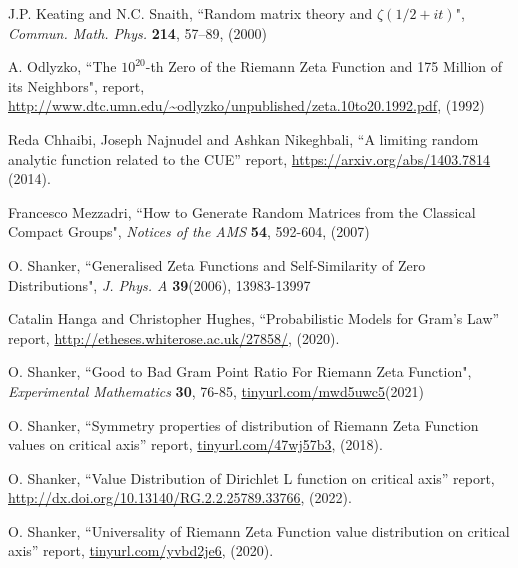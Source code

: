 \documentclass[twoside]{article}
\begin{document}

\begin{thebibliography}{10}

 J.P. Keating and N.C. Snaith, 
``Random matrix theory and $\zeta (1/2+it)$", 
{\it Commun. Math. Phys.} {\bf 214}, 57–89, (2000)

  A. Odlyzko,
``The $10^{20}$-th Zero of the Riemann Zeta
Function and 175 Million of its Neighbors", report,
\url{http://www.dtc.umn.edu/~odlyzko/unpublished/zeta.10to20.1992.pdf}, (1992)

 Reda Chhaibi, Joseph Najnudel and Ashkan Nikeghbali,
``A limiting random analytic function related to the CUE''
report,
\url{https://arxiv.org/abs/1403.7814}
(2014).

Francesco Mezzadri,
``How to Generate Random Matrices from the Classical
Compact Groups", {\it Notices of the AMS} {\bf 54}, 592-604, (2007)

 O. Shanker, 
``Generalised Zeta Functions and Self-Similarity of Zero Distributions",
{\it J.  Phys. A} {\bf39}(2006), 13983-13997

 Catalin Hanga and Christopher Hughes, 
``Probabilistic Models for Gram's Law''
 report,
\url{http://etheses.whiterose.ac.uk/27858/}, 
(2020). 

 O. Shanker, 
``Good to Bad Gram Point Ratio For Riemann Zeta Function",
{\it Experimental Mathematics} {\bf 30}, 76-85,
\url{tinyurl.com/mwd5uwc5}(2021)

 O. Shanker, 
``Symmetry properties of distribution of Riemann Zeta Function values on critical axis''
 report,
\url{tinyurl.com/47wj57b3}, 
(2018). 

 O. Shanker, 
``Value Distribution of Dirichlet L function on critical axis''
 report,
\url{http://dx.doi.org/10.13140/RG.2.2.25789.33766}, 
(2022). 

 O. Shanker, 
``Universality of Riemann Zeta Function value distribution on critical axis''
 report,
\url{tinyurl.com/yvbd2je6}, 
(2020). 




\end{thebibliography} 
\end{document}
